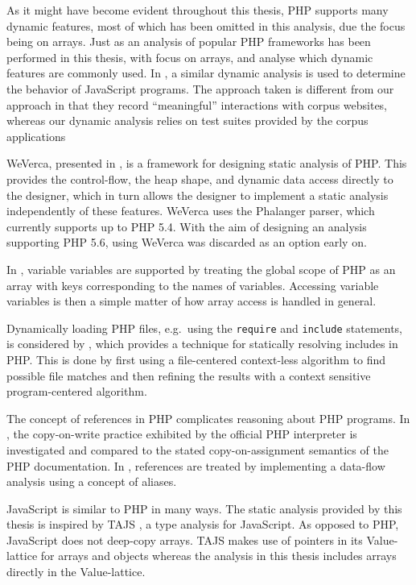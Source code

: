 As it might have become evident throughout this thesis, PHP supports many dynamic features, most of which has been omitted in this analysis, due the focus being on arrays. Just as an analysis of popular PHP frameworks has been performed in this thesis, with focus on arrays,   and  analyse which dynamic features are commonly used. In , a similar dynamic analysis is used to determine the behavior of JavaScript programs. The approach taken is different from our approach in that they record ``meaningful'' interactions with corpus websites, whereas our dynamic analysis relies on test suites provided by the corpus applications

WeVerca, presented in ,  is a framework for designing static analysis of PHP. This provides the control-flow, the heap shape, and dynamic data access directly to the designer, which in turn allows the designer to implement a static analysis independently of these features. WeVerca uses the Phalanger parser, which currently supports up to PHP 5.4. With the aim of designing an analysis supporting PHP 5.6, using WeVerca was discarded as an option early on.

In , variable variables are supported by treating the global scope of PHP as an array with keys corresponding to the names of variables. Accessing variable variables is then a simple matter of how array access is handled in general.

Dynamically loading PHP files, e.g.\ using the \texttt{require} and \texttt{include} statements, is considered by , which provides a technique for statically resolving includes in PHP. This is done by first using a file-centered context-less algorithm to find possible file matches and then refining the results with a context sensitive program-centered algorithm. 

The concept of references in PHP complicates reasoning about PHP programs. In , the copy-on-write practice exhibited by the official PHP interpreter is investigated and compared to the stated copy-on-assignment semantics of the PHP documentation. In ,  references are treated  by implementing a data-flow analysis using a concept of aliases. 


JavaScript is similar to PHP in many ways. The static analysis provided by this thesis is inspired by TAJS , a type analysis for JavaScript. As opposed to PHP, JavaScript does not deep-copy arrays. TAJS makes use of pointers in its Value-lattice for arrays and objects whereas the analysis in this thesis includes arrays directly in the Value-lattice.

